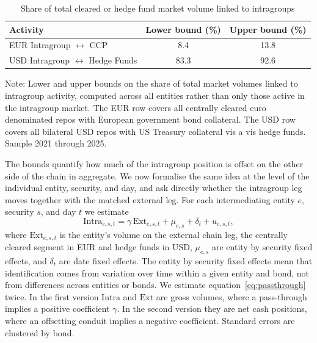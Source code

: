 \documentclass[english, 11pt, oneside, legal]{article}
\begin{document}
\begin{table}[t]
    \centering
    \caption{Share of total cleared or hedge fund market volume linked to intragroups}
    \label{tab:chain_bounds_unconditional}
    \begin{tabular}{lcc}
        \hline
        Activity & Lower bound (\%) & Upper bound (\%) \\
        \hline
        EUR Intragroup $\leftrightarrow$ CCP          & 8.4  & 13.8 \\
        USD Intragroup $\leftrightarrow$ Hedge Funds  & 83.3 & 92.6 \\
        \hline
    \end{tabular}
    \begin{flushleft}
        \footnotesize Note: Lower and upper bounds on the share of total market volumes linked to intragroup activity, computed across all entities rather than only those active in the intragroup market. The EUR row covers all centrally cleared euro denominated repos with European government bond collateral. The USD row covers all bilateral USD repos with US Treasury collateral vis a vis hedge funds. Sample 2021 through 2025.
    \end{flushleft}
\end{table}


The bounds quantify how much of the intragroup position is offset on the other side of the chain in aggregate. We now formalise the same idea at the level of the individual entity, security, and day, and ask directly whether the intragroup leg moves together with the matched external leg. For each intermediating entity $e$, security $s$, and day $t$ we estimate
\begin{equation}
    \text{Intra}_{e,s,t} = \gamma\,\text{Ext}_{e,s,t} + \mu_{e,s} + \delta_{t} + u_{e,s,t},
    \label{eq:passthrough}
\end{equation}
where $\text{Ext}_{e,s,t}$ is the entity's volume on the external chain leg, the centrally cleared segment in EUR and hedge funds in USD, $\mu_{e,s}$ are entity by security fixed effects, and $\delta_{t}$ are date fixed effects. The entity by security fixed effects mean that identification comes from variation over time within a given entity and bond, not from differences across entities or bonds. We estimate equation~\eqref{eq:passthrough} twice. In the first version $\text{Intra}$ and $\text{Ext}$ are gross volumes, where a pass-through implies a positive coefficient $\gamma$. In the second version they are net cash positions, where an offsetting conduit implies a negative coefficient. Standard errors are clustered by bond.
\end{document}
